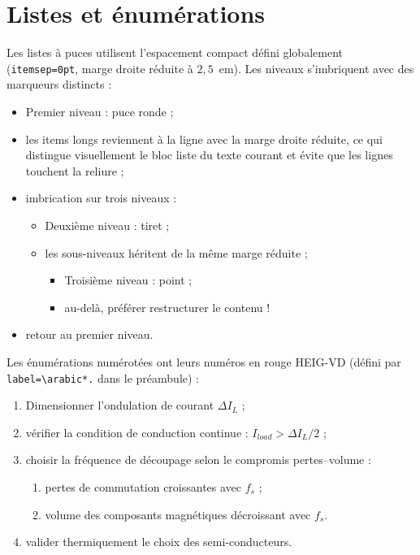 \section{Listes et énumérations}

Les listes à puces utilisent l'espacement compact défini globalement
(\texttt{itemsep=0pt}, marge droite réduite à \(2{,}5\)~em). Les
niveaux s'imbriquent avec des marqueurs distincts :

\begin{itemize}
  \item Premier niveau : puce ronde ;
  \item les items longs reviennent à la ligne avec la marge droite
    réduite, ce qui distingue visuellement le bloc liste du texte
    courant et évite que les lignes touchent la reliure ;
  \item imbrication sur trois niveaux :
  \begin{itemize}
    \item Deuxième niveau : tiret ;
    \item les sous-niveaux héritent de la même marge réduite ;
    \begin{itemize}
      \item Troisième niveau : point ;
      \item au-delà, préférer restructurer le contenu !
    \end{itemize}
  \end{itemize}
  \item retour au premier niveau.
\end{itemize}

Les énumérations numérotées ont leurs numéros en rouge HEIG-VD
(défini par \texttt{label=\textcolor{accent}{\textbackslash arabic*.}}
dans le préambule) :

\begin{enumerate}
  \item Dimensionner l'ondulation de courant $\Delta I_L$ ;
  \item vérifier la condition de conduction continue :
  $I_{load} > \Delta I_L / 2$ ;
  \item choisir la fréquence de découpage selon le compromis
    pertes--volume :
  \begin{enumerate}
    \item pertes de commutation croissantes avec $f_s$ ;
    \item volume des composants magnétiques décroissant avec $f_s$.
  \end{enumerate}
  \item valider thermiquement le choix des semi-conducteurs.
\end{enumerate}

